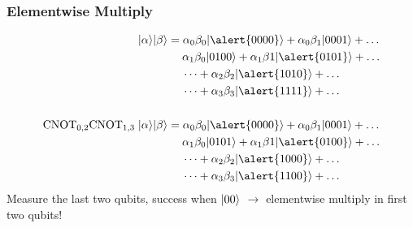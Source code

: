 \documentclass[
	11pt, %
]{beamer}
\begin{document}
\begin{frame}
    \frametitle{Elementwise Multiply}
    \begin{align*}
        \ket{\alpha}\ket{\beta}                                        & = \alpha_0\beta_0 \ket{\alert{0000}} + \alpha_0\beta_1\ket{0001} + \dots               \\
                                                                       & \hspace{0.45cm} \alpha_1\beta_0\ket{0100} + \alpha_1\beta{1}\ket{\alert{0101}} + \dots \\
                                                                       & \hspace{0.45cm} \dots + \alpha_2\beta_2\ket{\alert{1010}} + \dots                      \\
                                                                       & \hspace{0.45cm} \dots + \alpha_3\beta_3\ket{\alert{1111}} + \dots                      \\\\
        \text{CNOT}_{0, 2}\text{CNOT}_{1, 3} \;\ket{\alpha}\ket{\beta} & = \alpha_0\beta_0 \ket{\alert{0000}} + \alpha_0\beta_1\ket{0001} + \dots               \\
                                                                       & \hspace{0.45cm} \alpha_1\beta_0\ket{0101} + \alpha_1\beta{1}\ket{\alert{0100}} + \dots \\
                                                                       & \hspace{0.45cm} \dots + \alpha_2\beta_2\ket{\alert{1000}} + \dots                      \\
                                                                       & \hspace{0.45cm} \dots + \alpha_3\beta_3\ket{\alert{1100}} + \dots                      \\
    \end{align*}
    Measure the last two qubits, success when $\rvert00\rangle$ $\longrightarrow$ elementwise multiply in first two qubits!
\end{frame}

\end{document}
